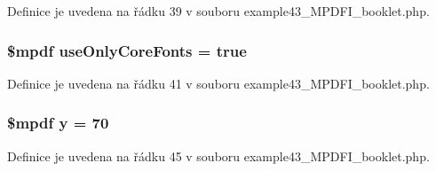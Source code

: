 Definice je uvedena na řádku 39 v souboru example43\-\_\-\-M\-P\-D\-F\-I\-\_\-booklet.\-php.

\hypertarget{example43___m_p_d_f_i__booklet_8php_af2f1fce5e41ebb499bcff9cc6f865a19}{
\subsubsection[{use\-Only\-Core\-Fonts}]{\setlength{\rightskip}{0pt plus 5cm}\$mpdf use\-Only\-Core\-Fonts = true}}\label{example43___m_p_d_f_i__booklet_8php_af2f1fce5e41ebb499bcff9cc6f865a19}


Definice je uvedena na řádku 41 v souboru example43\-\_\-\-M\-P\-D\-F\-I\-\_\-booklet.\-php.

\hypertarget{example43___m_p_d_f_i__booklet_8php_a3f83be162d14f38451e1bc419fbbbcbc}{
\subsubsection[{y}]{\setlength{\rightskip}{0pt plus 5cm}\$mpdf y = 70}}\label{example43___m_p_d_f_i__booklet_8php_a3f83be162d14f38451e1bc419fbbbcbc}


Definice je uvedena na řádku 45 v souboru example43\-\_\-\-M\-P\-D\-F\-I\-\_\-booklet.\-php.




